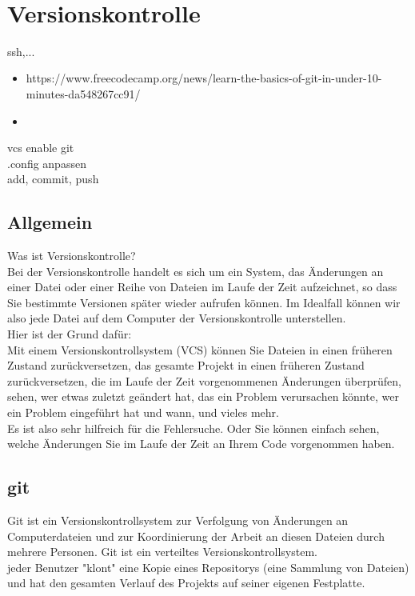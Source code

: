 \newpage~\\
\section{Versionskontrolle}
ssh,...
\begin{itemize}
	\item https://www.freecodecamp.org/news/learn-the-basics-of-git-in-under-10-minutes-da548267cc91/
	\item
\end{itemize}


vcs enable git\\
.config anpassen\\
add, commit, push
\subsection{Allgemein}
Was ist Versionskontrolle?\\


Bei der Versionskontrolle handelt es sich um ein System, das Änderungen an einer Datei oder einer Reihe von Dateien im Laufe der Zeit aufzeichnet, so dass Sie bestimmte Versionen später wieder aufrufen können. Im Idealfall können wir also jede Datei auf dem Computer der Versionskontrolle unterstellen.\\


Hier ist der Grund dafür:\\


Mit einem Versionskontrollsystem (VCS) können Sie Dateien in einen früheren Zustand zurückversetzen, das gesamte Projekt in einen früheren Zustand zurückversetzen, die im Laufe der Zeit vorgenommenen Änderungen überprüfen, sehen, wer etwas zuletzt geändert hat, das ein Problem verursachen könnte, wer ein Problem eingeführt hat und wann, und vieles mehr.\\


Es ist also sehr hilfreich für die Fehlersuche. Oder Sie können einfach sehen, welche Änderungen Sie im Laufe der Zeit an Ihrem Code vorgenommen haben.
\subsection{git}
Git ist ein Versionskontrollsystem zur Verfolgung von Änderungen an Computerdateien und zur Koordinierung der Arbeit an diesen Dateien durch mehrere Personen. Git ist ein verteiltes Versionskontrollsystem. \\


 jeder Benutzer "klont" eine Kopie eines Repositorys (eine Sammlung von Dateien) und hat den gesamten Verlauf des Projekts auf seiner eigenen Festplatte.\\
 
